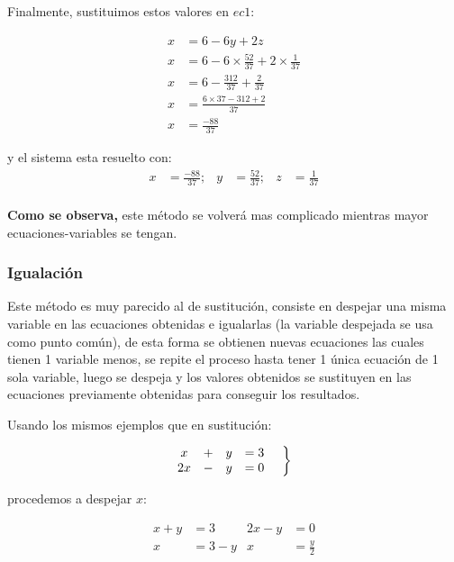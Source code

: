 \documentclass[12pt]{article}
\begin{document}
    Finalmente, sustituimos estos valores en $ ec1$:

    \begin{align*}
        x&= 6-6y+2z	\\
        x &= 6- 6\times \frac{52}{37} + 2\times \frac{1}{37}\\
        x&= 6- \frac{312}{37} + \frac{2}{37} \\
        x &= \frac{6\times37 - 312 + 2}{37}\\
        x &=\frac{-88}{37}
    \end{align*}

    y el sistema esta resuelto con:
    \begin{align*}
        x &=\frac{-88}{37} ;& y&=\frac{52}{37} ;& z&=\frac{1}{37}  		\\
    \end{align*}


    \textbf{Como se observa,} este método se volverá mas complicado mientras mayor
    ecuaciones-variables se tengan.

    \subsubsection*{Igualación} \label{Igualacion}

    Este método es muy parecido al de sustitución, consiste en despejar una misma
    variable en las ecuaciones obtenidas e igualarlas (la variable despejada se
    usa como punto común), de esta forma se obtienen
    nuevas ecuaciones las cuales tienen 1 variable menos, se repite el proceso
    hasta tener 1 única ecuación de 1 sola variable, luego se despeja y los valores
    obtenidos se sustituyen en las ecuaciones previamente obtenidas para conseguir
    los resultados.

    Usando los mismos ejemplos que en sustitución:


    \begin{equation*}
        \left.
        \begin{matrix}
            x &+& y &=3\\
            2x &-& y &=0
        \end{matrix}
        \hspace*{0.5cm}\right\rbrace
    \end{equation*}

   procedemos a despejar $x$:

    \begin{align*}
        x+y &=3     & 2x-y&=0 		\\
        x&=3-y      & x&= \frac{y}{2}
    \end{align*}
\end{document}
